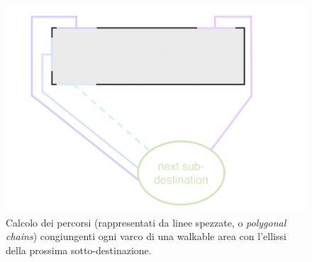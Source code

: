 \documentclass[12pt,a4paper,openright,oneside]{book}
\begin{document}
\begin{figure}
	\centering
	\includegraphics[width=0.8\linewidth]{figures/polygonal-chains-to-subdestination.png}
	\caption{Calcolo dei percorsi (rappresentati da linee spezzate, o \emph{polygonal chains}) congiungenti ogni varco di una walkable area con l’ellissi della prossima sotto-destinazione.}
	\label{fig:polygonal-chains-to-subdestination}
\end{figure}
\end{document}
